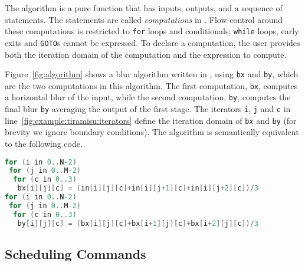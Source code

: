 The algorithm is a pure function that has inputs, outputs, and a sequence of statements.  The statements are called \textit{computations} in \framework.  Flow-control around these computations is restricted to \texttt{for} loops and conditionals;  \texttt{while} loops, early exits and \texttt{GOTO}s cannot be expressed.  To declare a computation, the user provides both the iteration domain of the computation and the expression to compute.  %

Figure~\ref{fig:algorithm} shows a blur algorithm written in \framework, using \texttt{bx} and \texttt{by}, which are the two computations in this algorithm.
The first computation, \texttt{bx}, computes a horizontal blur of the input, while the second computation, \texttt{by}, computes the final blur \texttt{by} averaging the output of the first stage.
The iterators \texttt{i}, \texttt{j} and \texttt{c} in line~\ref{fig:example:tiramisu:iterators} define the iteration domain of \texttt{bx} and \texttt{by} (for brevity we ignore boundary conditions).
The algorithm is semantically equivalent to the following code.

\begin{lstlisting}[language=C,escapechar=@]
for (i in 0..N-2)
 for (j in 0..M-2)
  for (c in 0..3)
   bx[i][j][c] = (in[i][j][c]+in[i][j+1][c]+in[i][j+2][c])/3
for (i in 0..N-2)
 for (j in 0..M-2)
  for (c in 0..3)
   by[i][j][c] = (bx[i][j][c]+bx[i+1][j][c]+bx[i+2][j][c])/3
\end{lstlisting}


\vspace{-0.25cm}
\subsection{Scheduling Commands}

